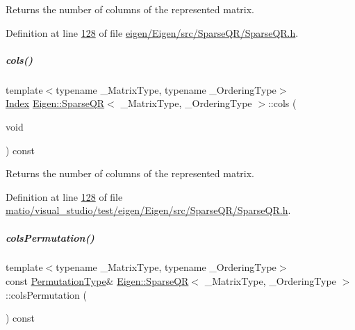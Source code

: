 \begin{DoxyReturn}{Returns}
the number of columns of the represented matrix. 
\end{DoxyReturn}


Definition at line \hyperlink{eigen_2_eigen_2src_2_sparse_q_r_2_sparse_q_r_8h_source_l00128}{128} of file \hyperlink{eigen_2_eigen_2src_2_sparse_q_r_2_sparse_q_r_8h_source}{eigen/\+Eigen/src/\+Sparse\+Q\+R/\+Sparse\+Q\+R.\+h}.

\mbox{\label{group___sparse_q_r___module_a57bedc9b1351c0995bae8ad0088a6fce}} 
\subparagraph{\texorpdfstring{cols()}{cols()}\hspace{0.1cm}{\footnotesize\ttfamily [2/2]}}
{\footnotesize\ttfamily template$<$typename \+\_\+\+Matrix\+Type, typename \+\_\+\+Ordering\+Type$>$ \\
\hyperlink{namespace_eigen_a62e77e0933482dafde8fe197d9a2cfde}{Index} \hyperlink{group___sparse_q_r___module_class_eigen_1_1_sparse_q_r}{Eigen\+::\+Sparse\+QR}$<$ \+\_\+\+Matrix\+Type, \+\_\+\+Ordering\+Type $>$\+::cols (\begin{DoxyParamCaption}\item[{void}]{ }\end{DoxyParamCaption}) const\hspace{0.3cm}{\ttfamily [inline]}}

\begin{DoxyReturn}{Returns}
the number of columns of the represented matrix. 
\end{DoxyReturn}


Definition at line \hyperlink{matio_2visual__studio_2test_2eigen_2_eigen_2src_2_sparse_q_r_2_sparse_q_r_8h_source_l00128}{128} of file \hyperlink{matio_2visual__studio_2test_2eigen_2_eigen_2src_2_sparse_q_r_2_sparse_q_r_8h_source}{matio/visual\+\_\+studio/test/eigen/\+Eigen/src/\+Sparse\+Q\+R/\+Sparse\+Q\+R.\+h}.

\mbox{\label{group___sparse_q_r___module_a140930ebbf89dfd57a173761716db38f}} 
\subparagraph{\texorpdfstring{cols\+Permutation()}{colsPermutation()}\hspace{0.1cm}{\footnotesize\ttfamily [1/2]}}
{\footnotesize\ttfamily template$<$typename \+\_\+\+Matrix\+Type, typename \+\_\+\+Ordering\+Type$>$ \\
const \hyperlink{group___core___module}{Permutation\+Type}\& \hyperlink{group___sparse_q_r___module_class_eigen_1_1_sparse_q_r}{Eigen\+::\+Sparse\+QR}$<$ \+\_\+\+Matrix\+Type, \+\_\+\+Ordering\+Type $>$\+::cols\+Permutation (\begin{DoxyParamCaption}{ }\end{DoxyParamCaption}) const\hspace{0.3cm}{\ttfamily [inline]}}

